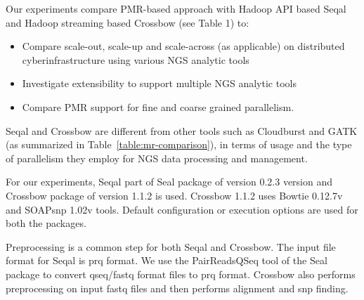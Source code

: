 \documentclass{acm_proc_article-sp}
\begin{document}

Our experiments compare PMR-based approach with Hadoop API based Seqal
and Hadoop streaming based Crossbow 
(see Table 1) to:

\begin{itemize}

\item{Compare scale-out, scale-up and scale-across (as applicable) on
    distributed cyberinfrastructure using various NGS analytic tools}


\item{Investigate extensibility to support multiple NGS analytic
    tools}
\item{Compare PMR support for fine and coarse grained parallelism}.
\end{itemize}

Seqal and Crossbow are different from other tools such as Cloudburst
and GATK (as summarized in Table~\ref{table:mr-comparison}), in terms
of usage and the type of parallelism they employ for NGS data
processing and management.


For our experiments, Seqal part of Seal package
of version 0.2.3 version and Crossbow package of version 1.1.2 is
used. Crossbow 1.1.2 uses Bowtie 0.12.7v and SOAPsnp 1.02v
tools. Default configuration or execution options are used for both
the packages.

Preprocessing is a common step for both Seqal and Crossbow. The input
file format for Seqal is prq format.  We use the PairReadsQSeq tool of
the Seal package to convert qseq/fastq format files to prq
format. Crossbow also performs preprocessing on input fastq files and
then performs alignment and snp finding. 
\end{document}

